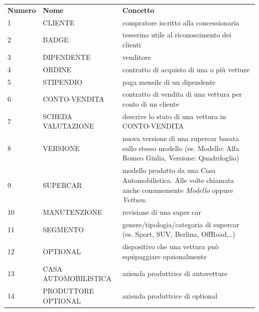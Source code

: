 \documentclass[11pt]{article}
\begin{document}
\newpage


\renewcommand{\arraystretch}{1.5}

\begin{table}[htbp]
    \centering
    \large
    \begin{tabularx}{\linewidth}{l l X}
        \rowcolor{red!20!}
        \textbf{Numero} & \textbf{Nome} & \textbf{Concetto} \\
        1 & CLIENTE & compratore iscritto alla concessionaria \\
        2 & BADGE & tesserino utile al riconoscimento dei clienti \\
        3 & DIPENDENTE & venditore \\
        4 & ORDINE & contratto di acquisto di una o più vetture \\
        5 & STIPENDIO & paga mensile di un dipendente \\
        6 & CONTO-VENDITA & contratto di vendita di una vettura per conto
        di un cliente \\
        7 & SCHEDA VALUTAZIONE & descrive lo stato di una vettura in
        CONTO-VENDITA\\
        8 & VERSIONE & nuova versione di una supercar basata sullo stesso
        modello (es. Modello: Alfa Romeo Giulia, Versione: Quadrifoglio) \\
        9 & SUPERCAR & modello prodotto da una Casa Automobilistica. Alle
        volte chiamata anche comunemente \textit{Modello} oppure \textit{Vettura}. \\
        10 & MANUTENZIONE & revisione di una super car \\
        11 & SEGMENTO & genere/tipologia/categoria di supercar (es. Sport, SUV, Berlina, OffRoad,..)\\
        12 & OPTIONAL & dispositivo che una vettura può equipaggiare
        opzionalmente \\
        13 & CASA AUTOMOBILISTICA & azienda produttrice di autovetture \\
        14 & PRODUTTORE OPTIONAL & azienda produttrice di optional
    \end{tabularx}
    \label{tab:tabella_linguaggio}
\end{table}
\end{document}
